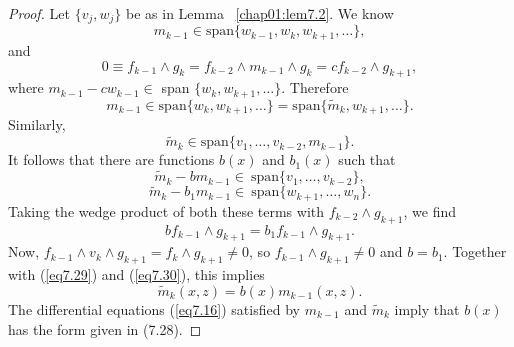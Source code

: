 \documentclass{surv-l}
\theoremstyle{plain}
\theoremstyle{definition}
\numberwithin{equation}{chapter}
\begin{document}
\begin{proof}
Let $\{v_{j}, w_{j}\}$ be as in Lemma ~\ref{chap01:lem7.2}. We know
\begin{equation*}
m_{k-1}\in \mathrm{span}\{w_{k-1}, w_{k},w_{k+1},\ldots\},
\end{equation*}
and
\begin{equation*}
0\equiv f_{k-1}\wedge g_{k}=f_{k-2}\wedge m_{k-1}\wedge g_{k}=cf_{k-2}\wedge g_{k+1},
\end{equation*}
where $ m_{k-1}-cw_{k-1}\in$ span $\{w_k, w_{k+1},\ldots\}$. Therefore
\begin{equation*}
m_{k-1}\in \mathrm{span}\{w_{k}, w_{k+1},\ldots\}= \mathrm{span}\{\tilde{m}_{k}, w_{k+1},\ldots\}.
\end{equation*}
Similarly,
\begin{equation*}
\tilde{m}_{k}\in \mathrm{span}\{v_{1},\ldots, v_{k-2},m_{k-1}\}.
\end{equation*}
It follows that there are functions $b(x)$ and $b_{1}(x)$ such that
\setcounter{equation}{28}
\begin{equation}\label{eq7.29}
\tilde{m}_{k}-bm_{k-1}\in\ \mathrm{span} \{v_{1},\ldots,v_{k-2}\},
\end{equation}
\begin{equation}\label{eq7.30}
\tilde{m}_{k}-b_{1}m_{k-1}\in\ \mathrm{span} \{w_{k+1},\ldots,w_{n}\}.
\end{equation}
Taking the wedge product of both these terms with $f_{k-2}\wedge g_{k+1}$, we find
\begin{equation*}
bf_{k-1}\wedge g_{k+1}=b_{1}f_{k-1}\wedge g_{k+1}.
\end{equation*}
Now, $f_{k-1}\wedge v_{k}\wedge g_{k+1}=f_{k}\wedge g_{k+1}\neq 0$, so $f_{k-1}\wedge g_{k+1}\neq 0$ and $b=b_{1}$. Together with (\ref{eq7.29}) and (\ref{eq7.30}), this implies
\begin{equation*}
\tilde{m}_{k}(x, z)=b(x)m_{k-1}(x,z).
\end{equation*}
The differential equations (\ref{eq7.16}) satisfied by $m_{k-1}$ and $\tilde{m}_{k}$ imply that $b(x)$ has the form given in (7.28).
\end{proof}
\end{document}
